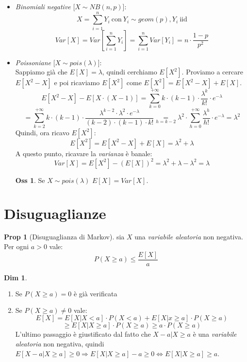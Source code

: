 \documentclass[12pt, a4paper]{report}
\theoremstyle{definition}
\newtheorem*{demonstration}{Dim}
\newtheorem*{proposition}{Prop}
\newtheorem*{observation}{Oss}
\newcommand\underrel[2]{\mathrel{\mathop{#2}\limits_{#1}}}%
\begin{document}
\begin{itemize}
	\[E[X^2]=E[X^2|\omega_1=0]\cdot P(\omega_1=0)+E[X^2|\omega_1=1]\cdot P(\omega_1=1)=E[(
	Y+1)^2|\omega_1=0]\cdot (1-p)\]
	\[=E[Y^2+2Y+1|\omega_1=0]\cdot (1-p)=(1-p)\cdot (E[Y^2]+2\cdot E[Y]+1)\]
	\[=(1-p)\cdot E[Y^2]+(1-p)\cdot \left(2\cdot \frac{1-p}{p}+1\right)\Rightarrow E[X^2]=\frac
	{2\cdot (1-p)\cdot p}{p^2}\cdot (1-p)\]
	Dunque, la \emph{varianza} di $X$ è:
	\[Var[X]=E[X^2]-(E[X])^2=\frac{2\cdot (1-p)^2}{p^2}+\frac{(1-p)\cdot p}{p^2}-
	\frac{(1-p)^2}{p^2}=\frac{1-p}{p^2}\]
	\item \emph{Binomiali negative} [$X\sim NB(n,p)$]:
	\[X=\sum_{i=1}^nY_i\ \text{con}\ Y_i\sim geom(p),Y_i\ \text{iid}\]
	\[Var[X]=Var\left[\sum_{i=1}^nY_i\right]=\sum_{i=1}^nVar[Y_i]=n\cdot \frac{1-p}{p^2}\]
	\item \emph{Poissoniane} [$X\sim pois(\lambda)$]:\\
	Sappiamo già che $E[X]=\lambda$, quindi cerchiamo $E[X^2]$. Proviamo a cercare
	$E[X^2-X]$ e poi ricaviamo $E[X^2]$ come \(E[X^2]=E[X^2-X]+E[X]\).
	\[E[X^2-X]-E[X\cdot (X-1)]=\sum_{k=0}^{+\infty}k\cdot (k-1)\cdot \frac{\lambda^k}{k!}\cdot e^{-\lambda}
	\]\[=\sum_{k=2}^{+\infty}k\cdot (k-1)\cdot \frac{\lambda^{k-2}\cdot \lambda^2\cdot e^{-\lambda}}
	{(k-2)\cdot (k-1)\cdot k!}\underrel{h=k-2}{=}\lambda^2\cdot \sum_{h=0}^{+\infty}\frac
	{\lambda^h}{h!}\cdot e^{-\lambda}=\lambda^2\]
	Quindi, ora ricavo $E[X^2]$:
	\[E[X^2]=E[X^2-X]+E[X]=\lambda^2+\lambda\]
	A questo punto, ricavare la \emph{varianza} è banale:
	\[Var[X]=E[X^2]-(E[X])^2=\lambda^2+\lambda-\lambda^2=\lambda\]

	\begin{observation} Se \(X\sim pois(\lambda)\) \(E[X]=Var[X]\).
	\end{observation}
\end{itemize}

\section{Disuguaglianze}
\begin{proposition}[Disuguaglianza di Markov]
	sia $X$ una \emph{variabile aleatoria} non negativa. Per ogni $a>0$ vale:
	\[P(X\geq a)\leq\frac{E[X]}{a}\]
\end{proposition}

\begin{demonstration}
	\mbox{}
	\begin{enumerate}[label=(\roman*)]
		\item Se \(P(X\geq a)=0\) è già verificata
		\item Se \(P(X\geq a)\neq 0\) vale:
		\[E[X]=E[X|X<a]\cdot P(X<a)+E[X|x\geq a]\cdot P(X\geq a)\]
		\[\geq E[X|X\geq a]\cdot P(X\geq a)\geq a\cdot P(X\geq a)\]
		L'ultimo passaggio è giustificato dal fatto che \(X-a|X\geq a\) è una
		\emph{variabile aleatoria} non negativa, quindi \(E[X-a|X\geq a]\geq 0
		\Rightarrow E[X|X\geq a]-a\geq 0\Leftrightarrow E[X|X\geq a]\geq a\).
	\end{enumerate}
\end{demonstration}
\end{document}
